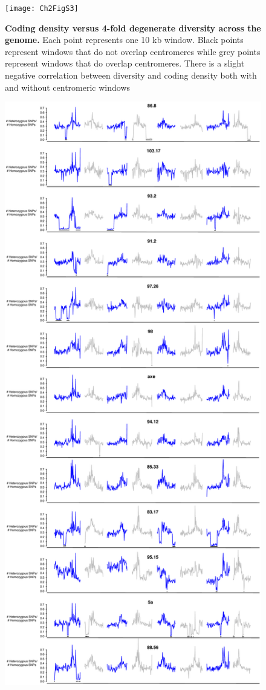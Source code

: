 \begin{figure}[h!]
      \centering
       \texttt{[image: Ch2FigS3]}
    \caption{\textbf{Coding density versus 4-fold degenerate diversity across the genome.} Each point represents one 10 kb window. Black points represent windows that do not overlap centromeres while grey points represent windows that do overlap centromeres. There is a slight negative correlation between diversity and coding density both with and without centromeric windows}
    \label{fig:figS3}
\end{figure}

\begin{figure}[h!]
      \centering
       \includegraphics[scale=0.1]{Ch2FigS4}

\end{figure}
